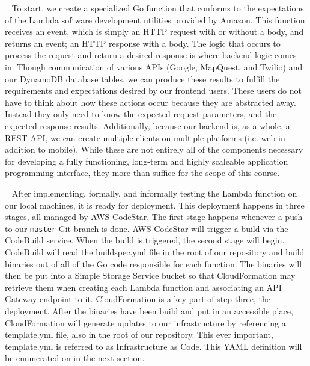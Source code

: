 \documentclass[10pt, a4paper]{article}
\begin{document}
\par ~ To start, we create a specialized Go function that conforms to the expectations of the Lambda software development utilities provided by Amazon. This function receives an event, which is simply an HTTP request with or without a body, and returns an event; an HTTP response with a body. The logic that occurs to process the request and return a desired response is where backend logic comes in. Though communication of various APIs (Google, MapQuest, and Twilio) and our DynamoDB database tables, we can produce these results to fulfill the requirements and expectations desired by our frontend users. These users do not have to think about how these actions occur because they are abstracted away. Instead they only need to know the expected request parameters, and the expected response results. Additionally, because our backend is, as a whole, a REST API, we can create multiple clients on multiple platforms (i.e. web in addition to mobile). While these are not entirely all of the components necessary for developing a fully functioning, long-term and highly scaleable application programming interface, they more than suffice for the scope of this course. 

\par ~ After implementing, formally, and informally testing the Lambda function on our local machines, it is ready for deployment. This deployment happens in three stages, all managed by AWS CodeStar. The first stage happens whenever a push to our \texttt{master} Git branch is done. AWS CodeStar will trigger a build via the CodeBuild service. When the build is triggered, the second stage will begin. CodeBuild will read the buildspec.yml file in the root of our repository and build binaries out of all of the Go code responsible for each function. The binaries will then be put into a Simple Storage Service bucket so that CloudFormation may retrieve them when creating each Lambda function and associating an API Gateway endpoint to it. CloudFormation is a key part of step three, the deployment. After the binaries have been build and put in an accessible place, CloudFormation will generate updates to our infrastructure by referencing a template.yml file, also in the root of our repository. This ever important, template.yml is referred to as Infrastructure as Code. This YAML definition will be enumerated on in the next section.
\end{document}
